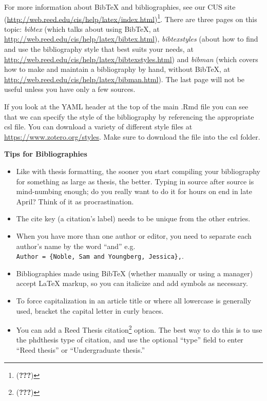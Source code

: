 \documentclass[12pt,twoside]{reedthesis}
\providecommand{\tightlist}{%
  \setlength{\itemsep}{0pt}\setlength{\parskip}{0pt}}
\theoremstyle{definition}
\theoremstyle{definition}
\theoremstyle{remark}
\begin{document}
  For more information about BibTeX and bibliographies, see our CUS site
  (\url{http://web.reed.edu/cis/help/latex/index.html})\footnote{({\textbf{???}})}.
  There are three pages on this topic: \emph{bibtex} (which talks about
  using BibTeX, at \url{http://web.reed.edu/cis/help/latex/bibtex.html}),
  \emph{bibtexstyles} (about how to find and use the bibliography style
  that best suits your needs, at
  \url{http://web.reed.edu/cis/help/latex/bibtexstyles.html}) and
  \emph{bibman} (which covers how to make and maintain a bibliography by
  hand, without BibTeX, at
  \url{http://web.reed.edu/cis/help/latex/bibman.html}). The last page
  will not be useful unless you have only a few sources.
  
  If you look at the YAML header at the top of the main .Rmd file you can
  see that we can specify the style of the bibliography by referencing the
  appropriate csl file. You can download a variety of different style
  files at \url{https://www.zotero.org/styles}. Make sure to download the
  file into the csl folder.
  
  \textbf{Tips for Bibliographies}
  
  \begin{itemize}
  \tightlist
  \item
    Like with thesis formatting, the sooner you start compiling your
    bibliography for something as large as thesis, the better. Typing in
    source after source is mind-numbing enough; do you really want to do
    it for hours on end in late April? Think of it as procrastination.
  \item
    The cite key (a citation's label) needs to be unique from the other
    entries.
  \item
    When you have more than one author or editor, you need to separate
    each author's name by the word ``and'' e.g.
    \texttt{Author\ =\ \{Noble,\ Sam\ and\ Youngberg,\ Jessica\},}.
  \item
    Bibliographies made using BibTeX (whether manually or using a manager)
    accept LaTeX markup, so you can italicize and add symbols as
    necessary.
  \item
    To force capitalization in an article title or where all lowercase is
    generally used, bracket the capital letter in curly braces.
  \item
    You can add a Reed Thesis citation\footnote{({\textbf{???}})} option.
    The best way to do this is to use the phdthesis type of citation, and
    use the optional ``type'' field to enter ``Reed thesis'' or
    ``Undergraduate thesis.''
  \end{itemize}
  
\end{document}
